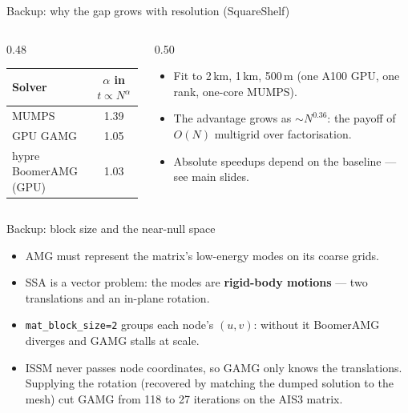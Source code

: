 \documentclass[10pt,aspectratio=169]{beamer}
\begin{document}
\appendix
\begin{frame}{Backup: why the gap grows with resolution (SquareShelf)}
  \begin{columns}[c]
    \begin{column}{0.48\textwidth}
      \begin{center}\small
      \begin{tabular}{lc}
        \toprule
        Solver & $\alpha$ in $t\propto N^{\alpha}$ \\
        \midrule
        MUMPS     & 1.39 \\
        GPU GAMG  & 1.05 \\
        hypre BoomerAMG (GPU) & 1.03 \\
        \bottomrule
      \end{tabular}
      \end{center}
    \end{column}
    \begin{column}{0.50\textwidth}
      \begin{itemize}
        \item Fit to 2\,km, 1\,km, 500\,m (one A100 GPU, one rank, one-core MUMPS).
        \item The advantage grows as $\sim N^{0.36}$: the payoff of $O(N)$ multigrid
              over factorisation.
        \item Absolute speedups depend on the baseline --- see main slides.
      \end{itemize}
    \end{column}
  \end{columns}
\end{frame}

\begin{frame}{Backup: block size and the near-null space}
  \begin{itemize}
    \item AMG must represent the matrix's low-energy modes on its coarse grids.
    \item SSA is a vector problem: the modes are \textbf{rigid-body motions} ---
          two translations and an in-plane rotation.
    \item \texttt{mat\_block\_size=2} groups each node's $(u,v)$: without it BoomerAMG
          diverges and GAMG stalls at scale.
    \item ISSM never passes node coordinates, so GAMG only knows the translations.
          Supplying the rotation (recovered by matching the dumped solution to the
          mesh) cut GAMG from 118 to 27 iterations on the AIS3 matrix.
  \end{itemize}
\end{frame}
\end{document}
